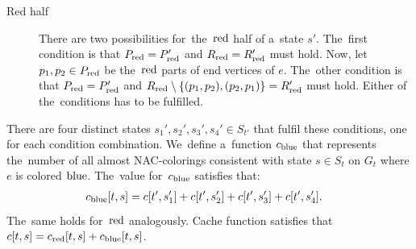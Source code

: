 \begin{lemma}
\begin{description}
		\item[Red half]
		      There are two possibilities for~the~\( \text{red} \) half of a~state \( s' \).
		      The~first condition is that \( P_{\text{red}} = P_{\text{red}}' \)
		      and \( R_{\text{red}} = R_{\text{red}}' \) must hold.
		      Now, let~\( p_1, p_2 \in P_{\text{red}} \) be the~\( \text{red} \) parts
		      of end vertices of \( e \).
		      The~other condition is that \( P_{\text{red}} = P_{\text{red}}' \) and
		      \( R_{\text{red}} \setminus \{(p_{1}, p_{2}), (p_{2}, p_{1})\} = R_{\text{red}}' \) must hold.
		      Either of the~conditions has to be fulfilled.

	\end{description}
	There are four distinct states \( s_1', s_2', s_3', s_4' \in S_{t'} \)
	that fulfil these conditions, one for each condition combination.
	We~define a~function \( c_{\text{blue}} \) that represents
	the~number of all almost NAC-colorings
	consistent with state \( s \in S_t \) on \( G_t \)
	where \( e \) is colored \( \text{blue} \).
	The~value for~\( c_{\text{blue}} \) satisfies that:
	\begin{align*}
		c_{\text{blue}}[t, s] & = c[t', s_1'] + c[t', s_2'] + c[t', s_3'] + c[t', s_4'].
	\end{align*}
	The~same holds for~\( \text{red} \) analogously.
	Cache function satisfies that  \( c[t, s] = c_{\text{red}}[t, s] + c_{\text{blue}}[t, s] \).
\end{lemma}
%
